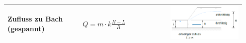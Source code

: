 \begin{landscape}
\begin{minipage}{0.4\linewidth}
\begin{tabular}{p{0.3\linewidth}|p{0.35\linewidth}|p{0.3\linewidth}}
			Zufluss zu Bach (gespannt)	& $ Q = m \cdot k \frac{H - L}{R} $ & \smallskip \includegraphics[width=\linewidth]{images/GW13Bachgespannt.PNG}  \\ \hline
			

\end{tabular}
\end{minipage}
\end{landscape}
